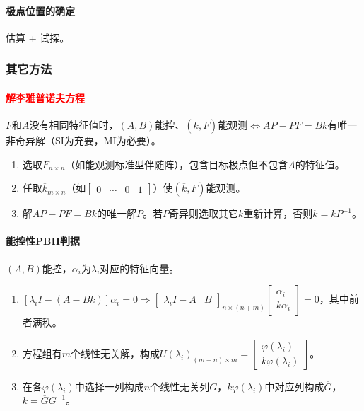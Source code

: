 \documentclass[
12pt, %
a4paper, 
oneside, %
]{scrartcl}
\begin{document}
\paragraph{极点位置的确定}
估算 + 试探。
\subsubsection[其它方法]{其它方法}
\paragraph{\textcolor{red}{解李雅普诺夫方程}}
$ F $和$ A $没有相同特征值时，$ (A, B) $能控、$ (\overline{k}, F) $能观测$ \Leftrightarrow $$ A P - P F = B \overline{k} $有唯一非奇异解（SI为充要，MI为必要）。
\begin{enumerate}
\item 选取$ F_{n \times n} $（如能观测标准型伴随阵），包含目标极点但不包含$ A $的特征值。
\item 任取$ \overline{k}_{m \times n} $（如$ \begin{bmatrix} 0 & \cdots & 0 & 1 \end{bmatrix} $）使$ (\overline{k}, F) $能观测。
\item 解$ A P - P F = B \overline{k} $的唯一解$ P $。若$ P $奇异则选取其它$ \overline{k} $重新计算，否则$ k = \overline{k} P^{-1} $。
\end{enumerate}
\paragraph{能控性PBH判据}
$ (A, B) $能控，$ \alpha_i $为$ \lambda_i $对应的特征向量。
\begin{enumerate}
\item $ [\lambda_i I - (A - Bk)]\alpha_i = 0 \Rightarrow \begin{bmatrix} \lambda_i I - A & B \end{bmatrix}_{n \times (n + m)} \begin{bmatrix} \alpha_i \\ k \alpha_i \end{bmatrix} = 0 $，其中前者满秩。
\item 方程组有$ m $个线性无关解，构成$ U(\lambda_i)_{(m + n) \times m} = \begin{bmatrix} \varphi(\lambda_i) \\ k \varphi(\lambda_i) \end{bmatrix} $。
\item 在各$ \varphi(\lambda_i) $中选择一列构成$ n $个线性无关列$ G $，$ k \varphi(\lambda_i) $中对应列构成$ \overline{G} $，$ k = \overline{G} G^{-1} $。
\end{enumerate}
\end{document}
